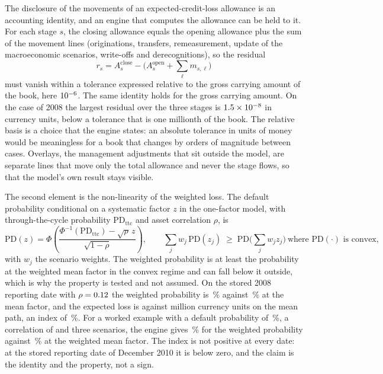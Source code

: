 The disclosure of the movements of an expected-credit-loss allowance is an accounting identity, and an engine that computes the allowance
can be held to it. For each stage $s$, the closing allowance equals the opening allowance plus the sum of the movement lines (originations, transfers,
remeasurement, update of the macroeconomic scenarios, write-offs and derecognitions), so the residual
\begin{equation}
r_{s}=A^{\mathrm{close}}_{s}-\Big(A^{\mathrm{open}}_{s}+\sum_{\ell} m_{s,\ell}\Big)
\label{eq:bs5-rollforward}
\end{equation}
must vanish within a tolerance expressed relative to the gross carrying amount of the book, here $10^{-6}$. The same identity holds for the gross
carrying amount. On the case of 2008 the largest residual over the three stages is $1.5\times10^{-8}$ in currency units, below a tolerance that is
one millionth of the book. The relative basis is a choice that the engine states: an absolute tolerance in units of money would be meaningless for a book that
changes by orders of magnitude between cases. Overlays, the management adjustments that sit outside the model, are separate lines that move only the
total allowance and never the stage flows, so that the model's own result stays visible.

The second element is the non-linearity of the weighted loss. The default probability conditional on a systematic factor $z$ in the one-factor
model, with through-the-cycle probability $\mathrm{PD}_{\mathrm{ttc}}$ and asset correlation $\rho$, is
\begin{equation}
\mathrm{PD}(z)=\Phi\!\left(\frac{\Phi^{-1}(\mathrm{PD}_{\mathrm{ttc}})-\sqrt{\rho}\,z}{\sqrt{1-\rho}}\right),
\qquad
\sum_{j} w_j\,\mathrm{PD}(z_j)\;\ge\;\mathrm{PD}\Big(\sum_j w_j z_j\Big)\ \text{where }\mathrm{PD}(\cdot)\text{ is convex},
\label{eq:bs5-jensen}
\end{equation}
with $w_j$ the scenario weights. The weighted probability is at least the probability at the weighted mean factor in the convex regime and can fall below it
outside, which is why the property is tested and not assumed. On the stored 2008 reporting date with $\rho=0.12$ the weighted probability is
\pxFivePdWeighted{}\,\% against \pxFivePdMean{}\,\% at the mean factor, and the expected loss is \pxFiveEclWeighted{} against \pxFiveEclMean{} million currency units on
the mean path, an index of \pxFiveIndex{}\,\%. For a worked example with a default probability of \pxFiveExPd{}\,\%, a correlation of \pxFiveExRho{} and three scenarios, the engine gives \pxFiveWeighted{}\,\% for the weighted
probability against \pxFiveAverage{}\,\% at the weighted mean factor. The index is not positive at every date: at the stored reporting date of December 2010 it is below zero, and the claim is the
identity and the property, not a sign.

